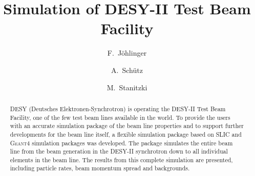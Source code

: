 \documentclass[preprint,12pt]{elsarticle}
\newcommand{\geant}{\textsc{Geant4}\xspace}
\newcommand{\slic}{\textsc{SLIC}\xspace}
\begin{document}
\begin{frontmatter}



\title{Simulation of DESY-II Test Beam Facility}


\author[Glasgow]{F.~Jöhlinger}
\author[desy]{A.~Schütz}
\author[desy]{M.~Stanitzki}
\address[desy]{DESY, Notkestrasse 85, D-22607 Hamburg}
\address[Glasgow]{University of Glasgow}

\begin{abstract}
DESY (Deutsches Elektronen-Synchrotron) is operating the DESY-II Test Beam 
Facility, one of the few test beam lines available in the world. To provide the 
users with an accurate simulation package of the beam line properties and to 
support further developments for the beam line itself, 
a flexible simulation package based on \slic and \geant simulation packages was developed.  
The package simulates the entire beam line from the beam generation in the 
DESY-II synchrotron down to all individual elements in the beam line. The 
results from this complete simulation are presented, including particle rates, beam 
momentum spread and backgrounds.

\end{abstract}

\begin{keyword}



\end{keyword}

\end{frontmatter}
















  
\end{document}
